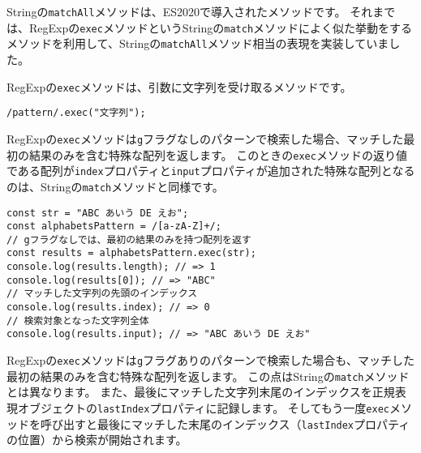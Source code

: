 \begin{tcolorbox}[enhanced jigsaw,breakable,title=RegExp.prototype.execでのString.prototype.matchAll]\label{regexp-exec}

Stringの\texttt{matchAll}メソッドは、ES2020で導入されたメソッドです。
それまでは、RegExpの\texttt{exec}メソッドというStringの\texttt{match}メソッドによく似た挙動をするメソッドを利用して、Stringの\texttt{matchAll}メソッド相当の表現を実装していました。

RegExpの\texttt{exec}メソッドは、引数に文字列を受け取るメソッドです。

\begin{lstlisting}
/pattern/.exec("文字列");
\end{lstlisting}

RegExpの\texttt{exec}メソッドは\texttt{g}フラグなしのパターンで検索した場合、マッチした最初の結果のみを含む特殊な配列を返します。
このときの\texttt{exec}メソッドの返り値である配列が\texttt{index}プロパティと\texttt{input}プロパティが追加された特殊な配列となるのは、Stringの\texttt{match}メソッドと同様です。

\begin{lstlisting}
const str = "ABC あいう DE えお";
const alphabetsPattern = /[a-zA-Z]+/;
// gフラグなしでは、最初の結果のみを持つ配列を返す
const results = alphabetsPattern.exec(str);
console.log(results.length); // => 1
console.log(results[0]); // => "ABC"
// マッチした文字列の先頭のインデックス
console.log(results.index); // => 0
// 検索対象となった文字列全体
console.log(results.input); // => "ABC あいう DE えお"
\end{lstlisting}

RegExpの\texttt{exec}メソッドは\texttt{g}フラグありのパターンで検索した場合も、マッチした最初の結果のみを含む特殊な配列を返します。
この点はStringの\texttt{match}メソッドとは異なります。
また、最後にマッチした文字列末尾のインデックスを正規表現オブジェクトの\texttt{lastIndex}プロパティに記録します。
そしてもう一度\texttt{exec}メソッドを呼び出すと最後にマッチした末尾のインデックス（\texttt{lastIndex}プロパティの位置）から検索が開始されます。


\end{tcolorbox}
